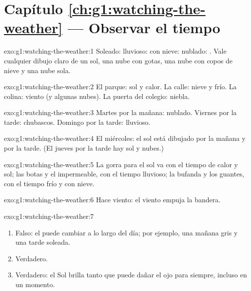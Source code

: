 \section*{Capítulo \ref{ch:g1:watching-the-weather} --- Observar el tiempo}

\begin{solution}{exo:g1:watching-the-weather:1}
Soleado: \quad lluvioso: \quad con nieve: \quad
nublado: . Vale cualquier dibujo claro de un sol, una nube con
gotas, una nube con copos de nieve y una nube sola.
\end{solution}

\begin{solution}{exo:g1:watching-the-weather:2}
El parque: sol y calor. La calle: nieve y frío. La colina: viento (y
algunas nubes). La puerta del colegio: niebla.
\end{solution}

\begin{solution}{exo:g1:watching-the-weather:3}
Martes por la mañana: nublado. Viernes por la tarde: chubascos. Domingo por
la tarde: lluvioso.
\end{solution}

\begin{solution}{exo:g1:watching-the-weather:4}
El miércoles: el sol está dibujado por la mañana y por la tarde.
(El jueves por la tarde hay sol y nubes.)
\end{solution}

\begin{solution}{exo:g1:watching-the-weather:5}
La gorra para el sol va con el tiempo de calor y sol; las botas y el
impermeable, con el tiempo lluvioso; la bufanda y los guantes, con el tiempo
frío y con nieve.
\end{solution}

\begin{solution}{exo:g1:watching-the-weather:6}
Hace viento: el viento empuja la bandera.
\end{solution}

\begin{solution}{exo:g1:watching-the-weather:7}
\begin{enumerate}
  \item Falso: el  puede cambiar a lo largo del día; por ejemplo, una
        mañana gris y una tarde soleada.
  \item Verdadero.
  \item Verdadero: el Sol brilla tanto que puede dañar el ojo para siempre,
        incluso en un momento.
\end{enumerate}
\end{solution}

